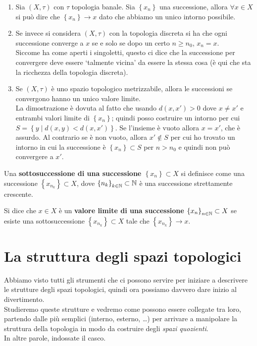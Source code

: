 \begin{example}
\begin{enumerate}
	\item Sia $(X,\tau)$ con $\tau$ topologia banale. Sia $\left\{x_n\right\}$ una 
		successione, allora $\forall x \in X$ si può dire che $\left\{x_n\right\} 
		\rightarrow x$ dato che abbiamo un unico intorno possibile. 
	\item Se invece si considera $(X,\tau)$ con la topologia discreta si 
		ha che ogni successione converge a $x$ se e solo se dopo un certo 
		$n \ge n_0$, $x_n = x$. \\ Siccome ha come aperti i singoletti, questo ci 
		dice che la successione per convergere deve essere `talmente vicina' da 
		essere la stessa cosa (è qui che sta la ricchezza della topologia 
		discreta).
	\item Se $(X,\tau)$ è uno spazio topologico metrizzabile, allora le 
		successioni se convergono hanno un unico valore limite. \\ La 
		dimostrazione è dovuta al fatto che usando $d(x,x') > 0$ dove 
		$x \neq x' $ e entrambi valori limite di $\left\{x_n\right\}$; quindi posso 
		costruire un intorno per cui $S = \left\{y\; |\; d(x, y) < d(x,x')\right\}$. Se 
		l'insieme è vuoto allora $x = x'$, che è assurdo. Al contrario se 
		è non vuoto, allora $x' \not\in S$ per cui ho trovato un intorno 
		in cui la successione è $\left\{x_n\right\} \subset S$ per $n > n_0$ e quindi 
		non può convergere a $x'$. 
\end{enumerate}
\end{example}

\begin{definition}
	Una \textbf{sottosuccessione di una successione $\left\{x_n\right\} \subset X$} si definisce come una successione $\left\{x_{n_k}\right\} \subset X$, dove $\left\{n_k\right\}_{k\in \mathbb{N}} \subset \mathbb{N}$ è una successione strettamente crescente. 
\end{definition}

\begin{definition}
	Si dice che $x \in X$ è un \textbf{valore limite di una successione $\left\{x_n\right\}_{n\in \mathbb{N}} \subset X$} se esiste una sottosuccessione $\left\{x_{n_k}\right\} \subset X$ tale che $\left\{x_{n_k}\right\} \rightarrow x$.
\end{definition}



\chapter{La struttura degli spazi topologici}
Abbiamo visto tutti gli strumenti che ci possono servire per iniziare a descrivere le strutture degli spazi topologici, quindi ora possiamo davvero dare inizio al divertimento. \\ Studieremo queste strutture e vedremo come possono essere collegate tra loro, partendo dalle più semplici (interno, esterno, \dots) per arrivare a manipolare la struttura della topologia in modo da costruire degli \textit{spazi quozienti}. \\ In altre parole, indossate il casco. 
